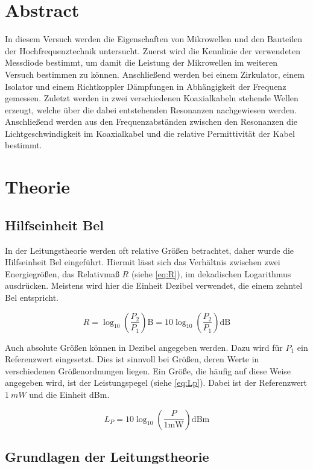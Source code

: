\section{Abstract}
In diesem Versuch werden die Eigenschaften von Mikrowellen und den Bauteilen der Hochfrequenztechnik untersucht. Zuerst wird die Kennlinie der verwendeten Messdiode bestimmt, um damit die Leistung der Mikrowellen im weiteren Versuch bestimmen zu können. Anschließend werden bei einem Zirkulator, einem Isolator und einem Richtkoppler Dämpfungen in Abhängigkeit der Frequenz gemessen. Zuletzt werden in zwei verschiedenen Koaxialkabeln stehende Wellen erzeugt, welche über die dabei entstehenden Resonanzen nachgewiesen werden. Anschließend werden aus den Frequenzabständen zwischen den Resonanzen die Lichtgeschwindigkeit im Koaxialkabel und die relative Permittivität der Kabel bestimmt.

\section{Theorie}
\subsection{Hilfseinheit Bel}
In der Leitungstheorie werden oft relative Größen betrachtet, daher wurde die Hilfseinheit Bel eingeführt. Hiermit lässt sich das Verhältnis zwischen zwei Energiegrößen, das Relativmaß $R$ (siehe \cref{eq:R}), im dekadischen Logarithmus ausdrücken. Meistens wird hier die Einheit Dezibel verwendet, die einem zehntel Bel entspricht.

\begin{equation}
	R = \log_{10} \left( \frac{P_2}{P_1}\right) \text{B} =10 \log_{10} \left( \frac{P_2}{P_1}\right) \text{dB}
	\label{eq:R}
\end{equation}

Auch absolute Größen können in Dezibel angegeben werden. Dazu wird für $P_1$ ein Referenzwert eingesetzt. Dies ist sinnvoll bei Größen, deren Werte in verschiedenen Größenordnungen liegen. Ein Größe, die häufig auf diese Weise angegeben wird, ist der Leistungspegel (siehe \cref{eq:Lp}). Dabei ist der Referenzwert $\SI{1}{mW}$ und die Einheit dBm.

\begin{equation}
	L_P = 10\log_{10}\left( \frac{P}{1\text{mW}}\right) \text{dBm}
\end{equation}

\subsection{Grundlagen der Leitungstheorie}
